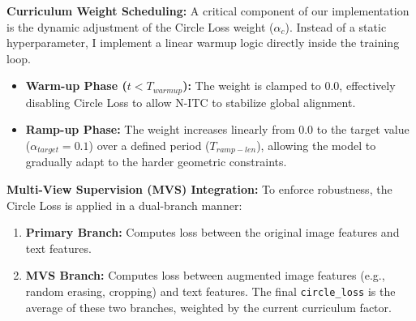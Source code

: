 \documentclass[../main.tex]{subfiles}
\begin{document}
\noindent \textbf{Curriculum Weight Scheduling:} A critical component of our implementation is the dynamic adjustment of the Circle Loss weight ($\alpha_c$). Instead of a static hyperparameter, I implement a linear warmup logic directly inside the training loop.

\begin{itemize}[itemsep=0.5em, topsep=0.5em]
    \item \textbf{Warm-up Phase ($t < T_{warm up}$):} The weight is clamped to 0.0, effectively disabling Circle Loss to allow N-ITC to stabilize global alignment.
    \item \textbf{Ramp-up Phase:} The weight increases linearly from 0.0 to the target value ($\alpha_{target} = 0.1$) over a defined period ($T_{ramp-len}$), allowing the model to gradually adapt to the harder geometric constraints.
\end{itemize}

\noindent \textbf{Multi-View Supervision (MVS) Integration:} To enforce robustness, the Circle Loss is applied in a dual-branch manner:

\begin{enumerate}[itemsep=0.5em, topsep=0.5em]
    \item \textbf{Primary Branch:} Computes loss between the original image features and text features.
    \item \textbf{MVS Branch:} Computes loss between augmented image features (e.g., random erasing, cropping) and text features. The final \texttt{circle\_loss} is the average of these two branches, weighted by the current curriculum factor.
\end{enumerate}
\end{document}
